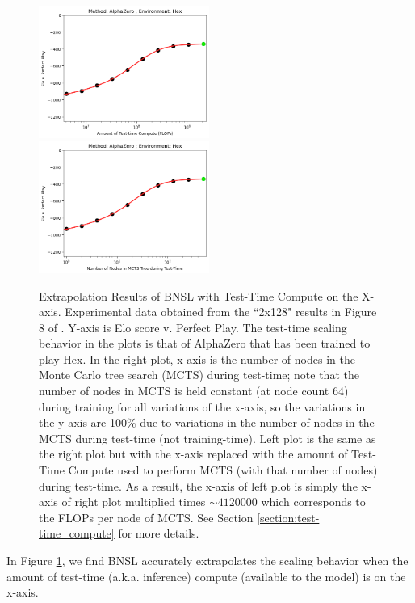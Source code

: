 \documentclass{article} %
\begin{document}
\begin{figure}[htbp]
    \centering
\includegraphics[width=0.497\textwidth]{figures/rl/test_time/test-time__compute.png}
\includegraphics[width=0.497\textwidth]{figures/rl/test_time/tree_search__nodes.png}
    \caption{
Extrapolation Results of BNSL with Test-Time Compute on the X-axis. Experimental data obtained from the ``2x128" results in Figure 8 of \cite{jones2021scaling}. Y-axis is Elo score v. Perfect Play. The test-time scaling behavior in the plots is that of AlphaZero that has been trained to play Hex. In the right plot, x-axis is the number of nodes in the Monte Carlo tree search (MCTS) during test-time; note that the number of nodes in MCTS is held constant (at node count 64) during training for all variations of the x-axis, so the variations in the y-axis are 100\% due to variations in the number of nodes in the MCTS during test-time (not training-time). Left plot is the same as the right plot but with the x-axis replaced with the amount of Test-Time Compute used to perform MCTS (with that number of nodes) during test-time. As a result, the x-axis of left plot is simply the x-axis of right plot multiplied times $\sim$$4120000$ which corresponds to the FLOPs per node of MCTS. See Section \ref{section:test-time_compute} for more details.
    }
    \label{fig:test-time_compute}
\end{figure}

In Figure \ref{fig:test-time_compute}, we find BNSL accurately extrapolates the scaling behavior when the amount of test-time (a.k.a. inference) compute (available to the model) is on the x-axis.
\end{document}
